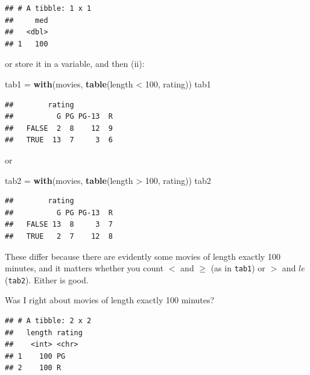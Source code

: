 \documentclass[]{tufte-book}
\newenvironment{Shaded}{}{}
\newcommand{\DecValTok}[1]{\textcolor[rgb]{0.25,0.63,0.44}{#1}}
\newcommand{\KeywordTok}[1]{\textcolor[rgb]{0.00,0.44,0.13}{\textbf{#1}}}
\newcommand{\NormalTok}[1]{#1}
\newcommand{\OperatorTok}[1]{\textcolor[rgb]{0.40,0.40,0.40}{#1}}
\newcommand{\StringTok}[1]{\textcolor[rgb]{0.25,0.44,0.63}{#1}}
\theoremstyle{definition}
\theoremstyle{definition}
\theoremstyle{definition}
\theoremstyle{remark}
\begin{document}
\begin{verbatim}
## # A tibble: 1 x 1
##     med
##   <dbl>
## 1   100
\end{verbatim}

or store it in a variable, and then (ii):

\begin{Shaded}
\begin{Highlighting}[]
\NormalTok{tab1 =}\StringTok{ }\KeywordTok{with}\NormalTok{(movies, }\KeywordTok{table}\NormalTok{(length }\OperatorTok{<}\StringTok{ }\DecValTok{100}\NormalTok{, rating))}
\NormalTok{tab1}
\end{Highlighting}
\end{Shaded}

\begin{verbatim}
##        rating
##          G PG PG-13  R
##   FALSE  2  8    12  9
##   TRUE  13  7     3  6
\end{verbatim}

or

\begin{Shaded}
\begin{Highlighting}[]
\NormalTok{tab2 =}\StringTok{ }\KeywordTok{with}\NormalTok{(movies, }\KeywordTok{table}\NormalTok{(length }\OperatorTok{>}\StringTok{ }\DecValTok{100}\NormalTok{, rating))}
\NormalTok{tab2}
\end{Highlighting}
\end{Shaded}

\begin{verbatim}
##        rating
##          G PG PG-13  R
##   FALSE 13  8     3  7
##   TRUE   2  7    12  8
\end{verbatim}

These differ because there are evidently some movies of length exactly
100 minutes, and it matters whether you count \(<\) and \(\ge\) (as in
\texttt{tab1}) or \(>\) and \(le\) (\texttt{tab2}). Either is good.

Was I right about movies of length exactly 100 minutes?

\begin{Shaded}
\end{Shaded}

\begin{verbatim}
## # A tibble: 2 x 2
##   length rating
##    <int> <chr> 
## 1    100 PG    
## 2    100 R
\end{verbatim}
\end{document}
